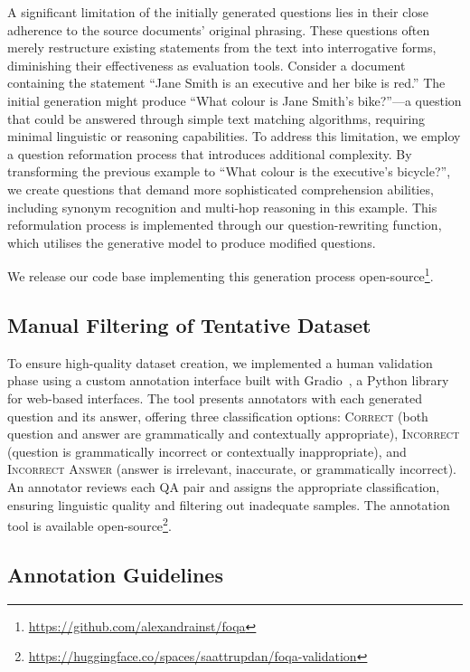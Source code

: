 \documentclass[11pt]{article}
\newcommand{\githuburl}{\url{https://github.com/alexandrainst/foqa}}
\newcommand{\appurl}{\url{https://huggingface.co/spaces/saattrupdan/foqa-validation}}
\begin{document}
A significant limitation of the initially generated questions lies in their close
adherence to the source documents' original phrasing. These questions often merely
restructure existing statements from the text into interrogative forms, diminishing
their effectiveness as evaluation tools. Consider a document containing the statement
``Jane Smith is an executive and her bike is red.'' The initial generation might produce
``What colour is Jane Smith's bike?''—a question that could be answered through simple
text matching algorithms, requiring minimal linguistic or reasoning capabilities. To
address this limitation, we employ a question reformation process that introduces
additional complexity. By transforming the previous example to ``What colour is the
executive's bicycle?'', we create questions that demand more sophisticated comprehension
abilities, including synonym recognition and multi-hop reasoning in this example. This
reformulation process is implemented through our question-rewriting function, which
utilises the generative model to produce modified questions.

We release our code base implementing this generation process
open-source\footnote{\githuburl}.


\subsection{Manual Filtering of Tentative Dataset}
\label{subsec:manual_filtering}

To ensure high-quality dataset creation, we implemented a human validation phase using a
custom annotation interface built with Gradio~\cite{abid2019gradio}, a Python library
for web-based interfaces. The tool presents annotators with each generated question and
its answer, offering three classification options: \textsc{Correct} (both question and
answer are grammatically and contextually appropriate), \textsc{Incorrect} (question is
grammatically incorrect or contextually inappropriate), and \textsc{Incorrect Answer}
(answer is irrelevant, inaccurate, or grammatically incorrect). An annotator reviews
each QA pair and assigns the appropriate classification, ensuring linguistic quality and
filtering out inadequate samples. The annotation tool is available
open-source\footnote{\appurl}.

\subsection{Annotation Guidelines}
\end{document}
